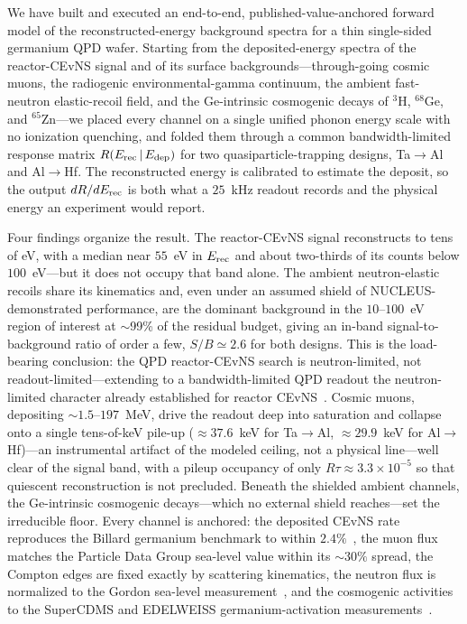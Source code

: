 We have built and executed an end-to-end, published-value-anchored forward
model of the reconstructed-energy background spectra for a thin single-sided
germanium QPD wafer. Starting from the deposited-energy spectra of the
reactor-CEvNS signal and of its surface backgrounds---through-going cosmic
muons, the radiogenic environmental-gamma continuum, the ambient fast-neutron
elastic-recoil field, and the Ge-intrinsic cosmogenic decays of $^{3}$H,
$^{68}$Ge, and $^{65}$Zn---we placed every channel on a single unified phonon
energy scale with no ionization quenching, and folded them through a common
bandwidth-limited response matrix $R(E_{\rm rec}\,|\,E_{\rm dep})$ for two
quasiparticle-trapping designs, Ta$\to$Al and Al$\to$Hf. The reconstructed
energy is calibrated to estimate the deposit, so the output $dR/dE_{\rm rec}$
is both what a $25$~kHz readout records and the physical energy an experiment
would report.

Four findings organize the result. The reactor-CEvNS signal reconstructs to
tens of eV, with a median near $55$~eV in $E_{\rm rec}$ and about two-thirds of
its counts below $100$~eV---but it does not occupy that band alone. The ambient
neutron-elastic recoils share its kinematics and, even under an assumed shield
of NUCLEUS-demonstrated performance, are the dominant background in the
$10$--$100$~eV region of interest at $\sim$99\% of the residual budget, giving
an in-band signal-to-background ratio of order a few, $S/B\simeq2.6$ for both
designs. This is the load-bearing conclusion: the QPD reactor-CEvNS search is
neutron-limited, not readout-limited---extending to a bandwidth-limited QPD
readout the neutron-limited character already established for reactor
CEvNS~\cite{biffl2023,conusneutron2019,ricochetneutron2023,nucleusbkg2026}. Cosmic muons, depositing
$\sim$$1.5$--$197$~MeV, drive the readout deep into saturation and collapse onto
a single tens-of-keV pile-up ($\approx$$37.6$~keV for Ta$\to$Al,
$\approx$$29.9$~keV for Al$\to$Hf)---an instrumental artifact of the modeled
ceiling, not a physical line---well clear of the signal band, with a pileup
occupancy of only $R\tau\approx3.3\times10^{-5}$ so that quiescent
reconstruction is not precluded. Beneath the shielded ambient channels, the
Ge-intrinsic cosmogenic decays---which no external shield reaches---set the
irreducible floor. Every channel is anchored: the deposited CEvNS rate
reproduces the Billard germanium benchmark to within $2.4\%$~\cite{billard2017},
the muon flux matches the Particle Data Group sea-level value within its
$\sim$$30\%$ spread, the Compton edges are fixed exactly by scattering
kinematics, the neutron flux is normalized to the Gordon sea-level
measurement~\cite{gordon2004}, and the cosmogenic activities to the SuperCDMS
and EDELWEISS germanium-activation measurements~\cite{amman2019,edelweiss2017}.

